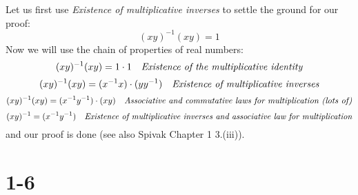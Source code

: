 \documentclass{article}
\begin{document}
Let us first use \emph{Existence of multiplicative inverses} to settle the ground for our proof:
\begin{equation*}
	(xy)^{-1}(xy) = 1
\end{equation*}
Now we will use the chain of properties of real numbers:
\begin{equation*}
	(xy)^{-1}(xy) = 1 \cdot 1 \ \ \ \emph{Existence of the multiplicative identity}
\end{equation*}
\begin{equation*}
	(xy)^{-1}(xy) = (x^{-1}x) \cdot (yy^{-1}) \ \ \ \emph{Existence of multiplicative inverses}
\end{equation*}
\begin{equation*}
	(xy)^{-1}(xy) = (x^{-1}y^{-1}) \cdot (xy) \ \ \ \emph{Associative and commutative laws for multiplication (lots of)} 
\end{equation*}
\begin{equation*}
	(xy)^{-1} = (x^{-1}y^{-1}) \ \ \ \emph{Existence of multiplicative inverses and associative law for multiplication} 
\end{equation*}
and our proof is done (see also Spivak Chapter 1 3.(iii)).


\section*{1-6}
\end{document}
